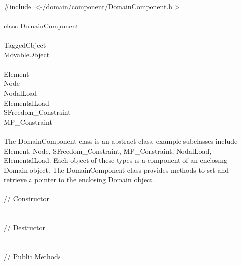 
   \\
\indent \#include $<\tilde{ }$/domain/component/DomainComponent.h$>$  \\

  \\
\indent class DomainComponent \\

 \\
\indent  TaggedObject \\
\indent  MovableObject \\
\indent{} \\
\indent\indent\indent  Element \\
\indent\indent\indent  Node \\
\indent\indent\indent  NodalLoad \\
\indent\indent\indent  ElementalLoad \\
\indent\indent\indent  SFreedom\_Constraint \\
\indent\indent\indent  MP\_Constraint \\

  \\
\indent The DomainComponent class is an abstract class, example
subclasses include Element, Node, SFreedom\_Constraint, MP\_Constraint,
NodalLoad, ElementalLoad. Each object of these types is a component of
an enclosing Domain object. The DomainComponent class provides methods
to set and retrieve a pointer to the enclosing Domain object. \\

  \\
\indent\indent // Constructor  \\
\indent{}  \\ \\
\indent\indent // Destructor  \\
\indent{}  \\ \\
\indent\indent // Public Methods  \\
\indent{} \\
\indent{}\\
\indent{} \\

